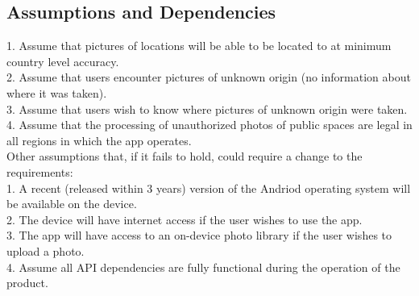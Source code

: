 \documentclass[]{article}
\begin{document}
\subsection{Assumptions and Dependencies}
\label{sub:assumptions_and_dependencies}
1. Assume that pictures of locations will be able to be located to at minimum country level accuracy.\\
2. Assume that users encounter pictures of unknown origin (no information about where it was taken).\\
3. Assume that users wish to know where pictures of unknown origin were taken.\\
4. Assume that the processing of unauthorized photos of public spaces are legal in all regions in which the app operates. \medskip \\
Other assumptions that, if it fails to hold, could require a change to the requirements:\\
1. A recent (released within 3 years) version of the Andriod operating system will be available on the device.\\
2. The device will have internet access if the user wishes to use the app.\\
3. The app will have access to an on-device photo library if the user wishes to upload a photo.\\
4. Assume all API dependencies are fully functional during the operation of the product.
\end{document}
